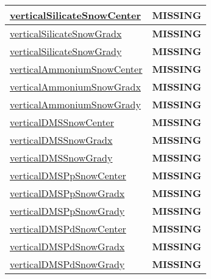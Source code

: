 {\begin{center}
\begin{longtable}{| p{2.0in} | p{4.0in} |}
    \hline
    \hyperref[subsec:var_sec_tracer_reconstruction_verticalSilicateSnowCenter]{verticalSilicateSnowCenter} & {\bf \color{red} MISSING} \\
    \hline
    \hyperref[subsec:var_sec_tracer_reconstruction_verticalSilicateSnowGradx]{verticalSilicateSnowGradx} & {\bf \color{red} MISSING} \\
    \hline
    \hyperref[subsec:var_sec_tracer_reconstruction_verticalSilicateSnowGrady]{verticalSilicateSnowGrady} & {\bf \color{red} MISSING} \\
    \hline
    \hyperref[subsec:var_sec_tracer_reconstruction_verticalAmmoniumSnowCenter]{verticalAmmoniumSnowCenter} & {\bf \color{red} MISSING} \\
    \hline
    \hyperref[subsec:var_sec_tracer_reconstruction_verticalAmmoniumSnowGradx]{verticalAmmoniumSnowGradx} & {\bf \color{red} MISSING} \\
    \hline
    \hyperref[subsec:var_sec_tracer_reconstruction_verticalAmmoniumSnowGrady]{verticalAmmoniumSnowGrady} & {\bf \color{red} MISSING} \\
    \hline
    \hyperref[subsec:var_sec_tracer_reconstruction_verticalDMSSnowCenter]{verticalDMSSnowCenter} & {\bf \color{red} MISSING} \\
    \hline
    \hyperref[subsec:var_sec_tracer_reconstruction_verticalDMSSnowGradx]{verticalDMSSnowGradx} & {\bf \color{red} MISSING} \\
    \hline
    \hyperref[subsec:var_sec_tracer_reconstruction_verticalDMSSnowGrady]{verticalDMSSnowGrady} & {\bf \color{red} MISSING} \\
    \hline
    \hyperref[subsec:var_sec_tracer_reconstruction_verticalDMSPpSnowCenter]{verticalDMSPpSnowCenter} & {\bf \color{red} MISSING} \\
    \hline
    \hyperref[subsec:var_sec_tracer_reconstruction_verticalDMSPpSnowGradx]{verticalDMSPpSnowGradx} & {\bf \color{red} MISSING} \\
    \hline
    \hyperref[subsec:var_sec_tracer_reconstruction_verticalDMSPpSnowGrady]{verticalDMSPpSnowGrady} & {\bf \color{red} MISSING} \\
    \hline
    \hyperref[subsec:var_sec_tracer_reconstruction_verticalDMSPdSnowCenter]{verticalDMSPdSnowCenter} & {\bf \color{red} MISSING} \\
    \hline
    \hyperref[subsec:var_sec_tracer_reconstruction_verticalDMSPdSnowGradx]{verticalDMSPdSnowGradx} & {\bf \color{red} MISSING} \\
    \hline
    \hyperref[subsec:var_sec_tracer_reconstruction_verticalDMSPdSnowGrady]{verticalDMSPdSnowGrady} & {\bf \color{red} MISSING} \\

\end{longtable}
\end{center}}

